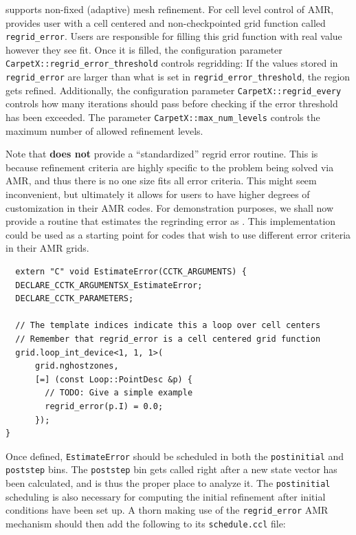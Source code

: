 \CarpetX\space supports non-fixed (adaptive) mesh refinement. For cell level control of AMR, \CarpetX\space provides user with a cell centered and non-checkpointed grid function called \texttt{regrid\_error}. Users are responsible for filling this grid function with real value however they see fit. Once it is filled, the configuration parameter \texttt{CarpetX::regrid\_error\_threshold} controls regridding: If the values stored in \texttt{regrid\_error} are larger than what is set in \texttt{regrid\_error\_threshold}, the region gets refined. Additionally, the configuration parameter \texttt{CarpetX::regrid\_every} controls how many iterations should pass before checking if the error threshold has been exceeded. The parameter \texttt{CarpetX::max\_num\_levels} controls the maximum number of allowed refinement levels.

Note that \CarpetX\space \textbf{does not} provide a ``standardized'' regrid error routine. This is because refinement criteria are highly specific to the problem being solved via AMR, and thus there is no one size fits all error criteria. This might seem inconvenient, but ultimately it allows for users to have higher degrees of customization in their AMR codes. For demonstration purposes, we shall now provide a routine that estimates the regrinding error as . This implementation could be used as a starting point for codes that wish to use different error criteria in their AMR grids.

\begin{lstlisting}
  extern "C" void EstimateError(CCTK_ARGUMENTS) {
  DECLARE_CCTK_ARGUMENTSX_EstimateError;
  DECLARE_CCTK_PARAMETERS;

  // The template indices indicate this a loop over cell centers
  // Remember that regrid_error is a cell centered grid function
  grid.loop_int_device<1, 1, 1>(
      grid.nghostzones,
      [=] (const Loop::PointDesc &p) {
        // TODO: Give a simple example
        regrid_error(p.I) = 0.0;
      });
}
\end{lstlisting}

Once defined, \texttt{EstimateError} should be scheduled in both the \texttt{postinitial} and \texttt{poststep} bins. The \texttt{poststep} bin gets called right after a new state vector has been calculated, and is thus the proper place to analyze it. The \texttt{postinitial} scheduling is also necessary for computing the initial refinement after initial conditions have been set up. A thorn making use of the \texttt{regrid\_error} AMR mechanism should then add the following to its \texttt{schedule.ccl} file:

